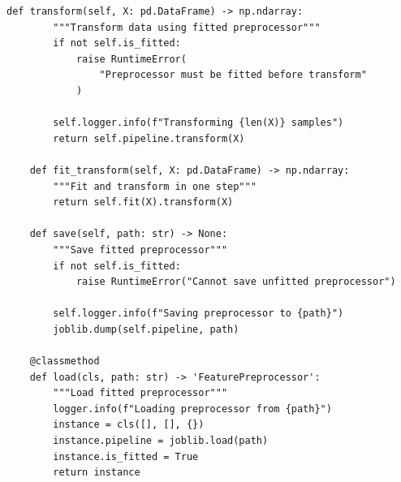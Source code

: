 \begin{lstlisting}[style=python, caption=Production ML Pipeline - Preprocessing Module]
    def transform(self, X: pd.DataFrame) -> np.ndarray:
        """Transform data using fitted preprocessor"""
        if not self.is_fitted:
            raise RuntimeError(
                "Preprocessor must be fitted before transform"
            )

        self.logger.info(f"Transforming {len(X)} samples")
        return self.pipeline.transform(X)

    def fit_transform(self, X: pd.DataFrame) -> np.ndarray:
        """Fit and transform in one step"""
        return self.fit(X).transform(X)

    def save(self, path: str) -> None:
        """Save fitted preprocessor"""
        if not self.is_fitted:
            raise RuntimeError("Cannot save unfitted preprocessor")

        self.logger.info(f"Saving preprocessor to {path}")
        joblib.dump(self.pipeline, path)

    @classmethod
    def load(cls, path: str) -> 'FeaturePreprocessor':
        """Load fitted preprocessor"""
        logger.info(f"Loading preprocessor from {path}")
        instance = cls([], [], {})
        instance.pipeline = joblib.load(path)
        instance.is_fitted = True
        return instance
\end{lstlisting}

